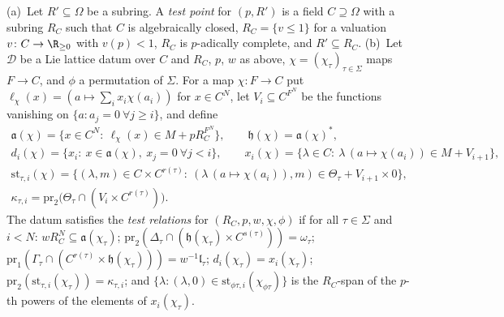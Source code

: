 \begin{definition}\label{pf:tower:def-test}
(a)~Let $R'\subseteq\Omega$ be a subring. A \emph{test point} for $(p,R')$ is a field $C\supseteq\Omega$ with a subring
$R_C$ such that $C$ is algebraically closed, $R_C=\{v\le1\}$ for a valuation $v\colon C\to\R_{\ge0}$ with $v(p)<1$,
$R_C$ is $p$-adically complete, and $R'\subseteq R_C$.
(b)~Let $\mathcal D$ be a Lie lattice datum over $C$ and $R_C$, $p$, $w$ as above, $\chi=(\chi_\tau)_{\tau\in\Sigma}$ maps
$F\to C$, and $\phi$ a permutation of $\Sigma$. For a map $\chi\colon F\to C$ put
$\ell_\chi(x)=(a\mapsto\sum_ix_i\chi(a_i))$ for $x\in C^N$, let $V_i\subseteq C^{F^N}$ be the functions vanishing on
$\{a:a_j=0\ \forall j\ge i\}$, and define
\begin{gather*}
\mathfrak a(\chi)=\{x\in C^N:\ \ell_\chi(x)\in M+pR_C^{F^N}\},\qquad\mathfrak h(\chi)=\mathfrak a(\chi)^{*},\\
d_i(\chi)=\{x_i:\ x\in\mathfrak a(\chi),\ x_j=0\ \forall j<i\},\qquad
x_i(\chi)=\{\lambda\in C:\ \lambda\,(a\mapsto\chi(a_i))\in M+V_{i+1}\},\\
\mathrm{st}_{\tau,i}(\chi)=\{(\lambda,m)\in C\times C^{r(\tau)}:\ (\lambda\,(a\mapsto\chi(a_i)),m)\in\Theta_\tau+V_{i+1}\times0\},\\
\kappa_{\tau,i}=\mathrm{pr}_2\bigl(\Theta_\tau\cap(V_i\times C^{r(\tau)})\bigr).
\end{gather*}
The datum satisfies the \emph{test relations} for $(R_C,p,w,\chi,\phi)$ if for all $\tau\in\Sigma$ and $i<N$:
$wR_C^N\subseteq\mathfrak a(\chi_\tau)$; $\mathrm{pr}_2(\Delta_\tau\cap(\mathfrak h(\chi_\tau)\times C^{s(\tau)}))=\omega_\tau$;
$\mathrm{pr}_1(\Gamma_\tau\cap(C^{r(\tau)}\times\mathfrak h(\chi_\tau)))=w^{-1}\mathfrak l_\tau$;
$d_i(\chi_\tau)=x_i(\chi_\tau)$; $\mathrm{pr}_2(\mathrm{st}_{\tau,i}(\chi_\tau))=\kappa_{\tau,i}$; and
$\{\lambda:(\lambda,0)\in\mathrm{st}_{\phi\tau,i}(\chi_{\phi\tau})\}$ is the $R_C$-span of the $p$-th powers of the
elements of $x_i(\chi_\tau)$.
\end{definition}

